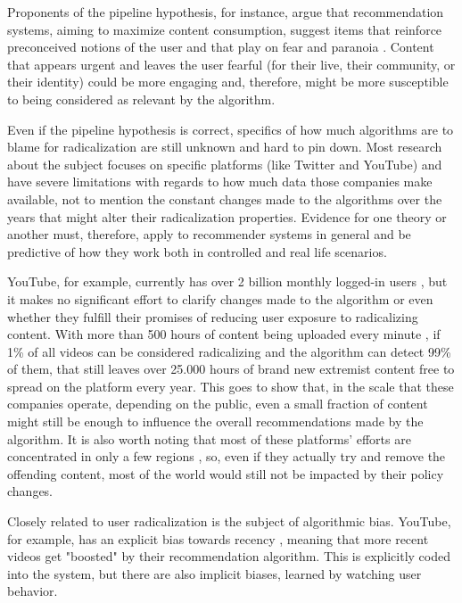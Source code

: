 Proponents of the pipeline hypothesis, for instance, argue that recommendation
systems, aiming to maximize content consumption, suggest items that reinforce
preconceived notions of the user and that play on fear and paranoia
\citep{ribeiro_auditing_2020}. Content that appears urgent and leaves the user
fearful (for their live, their community, or their identity) could be more
engaging and, therefore, might be more susceptible to being considered as
relevant by the algorithm.

Even if the pipeline hypothesis is correct, specifics of how much algorithms are
to blame for radicalization are still unknown and hard to pin down. Most
research about the subject focuses on specific platforms (like Twitter and
YouTube) and have severe limitations with regards to how much data those
companies make available, not to mention the constant changes made to the
algorithms over the years that might alter their radicalization properties.
Evidence for one theory or another must, therefore, apply to recommender systems
in general and be predictive of how they work both in controlled and real life
scenarios.

YouTube, for example, currently has over 2 billion monthly logged-in users
\citep{noauthor_youtube_nodate}, but it makes no significant effort to clarify
changes made to the algorithm or even whether they fulfill their promises of
reducing user exposure to radicalizing content. With more than 500 hours of
content being uploaded every minute \citep{noauthor_youtube_nodate}, if 1\% of
all videos can be considered radicalizing and the algorithm can detect 99\% of
them, that still leaves over 25.000 hours of brand new extremist content free to
spread on the platform every year. This goes to show that, in the scale that
these companies operate, depending on the public, even a small fraction of
content might still be enough to influence the overall recommendations made by
the algorithm. It is also worth noting that most of these platforms' efforts are
concentrated in only a few regions \citep{newton_leaked_2021}, so, even if they
actually try and remove the offending content, most of the world would still not
be impacted by their policy changes.

Closely related to user radicalization is the subject of algorithmic bias.
YouTube, for example, has an explicit bias towards recency
\citep{covington_deep_2016}, meaning that more recent videos get "boosted" by
their recommendation algorithm. This is explicitly coded into the system, but
there are also implicit biases, learned by watching user behavior.

